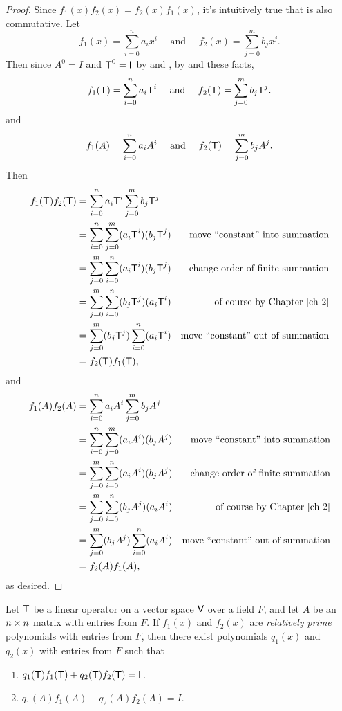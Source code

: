 \begin{proof}
Since \(f_1(x)f_2(x) = f_2(x)f_1(x)\), it's intuitively true that  is also commutative.
Let
\[
    f_1(x) = \sum_{i = 0}^n a_i x^i \quad \text{ and } \quad f_2(x) = \sum_{j = 0}^m b_j x^j.
\]
Then since \(A^0 = I\) and \(\textsf{T}^0 = \textsf{I}_{_{}}\) by  and , by  and these facts,
\[
    f_1(\textsf{T}) = \sum_{i = 0}^n a_i \textsf{T}^i \quad \text{ and } \quad f_2(\textsf{T}) = \sum_{j = 0}^m b_j \textsf{T}^j.
\]
and
\[
    f_1(A) = \sum_{i = 0}^n a_i A^i \quad \text{ and } \quad f_2(\textsf{T}) = \sum_{j = 0}^m b_j A^j.
\]
Then
\begin{align*}
    f_1(\T) f_2(\T) & = \sum_{i = 0}^n a_i \T^i \sum_{j = 0}^m b_j \T^j \\
                    & = \sum_{i = 0}^n \sum_{j = 0}^m (a_i \T^i) (b_j \T^j) & \text{move ``constant'' into summation} \\
                    & = \sum_{j = 0}^m \sum_{i = 0}^n (a_i \T^i) (b_j \T^j) & \text{change order of finite summation} \\
                    & = \sum_{j = 0}^m \sum_{i = 0}^n (b_j \T^j) (a_i \T^i) & \text{of course by \CH{2}} \\
                    & = \sum_{j = 0}^m (b_j \T^j) \sum_{i = 0}^n (a_i \T^i) & \text{move ``constant'' out of summation} \\
                    & = f_2(\T) f_1(\T),
\end{align*}
and
\begin{align*}
    f_1(A) f_2(A) & = \sum_{i = 0}^n a_i A^i \sum_{j = 0}^m b_j A^j \\
                    & = \sum_{i = 0}^n \sum_{j = 0}^m (a_i A^i) (b_j A^j) & \text{move ``constant'' into summation} \\
                    & = \sum_{j = 0}^m \sum_{i = 0}^n (a_i A^i) (b_j A^j) & \text{change order of finite summation} \\
                    & = \sum_{j = 0}^m \sum_{i = 0}^n (b_j A^j) (a_i A^i) & \text{of course by \CH{2}} \\
                    & = \sum_{j = 0}^m (b_j A^j) \sum_{i = 0}^n (a_i A^i) & \text{move ``constant'' out of summation} \\
                    & = f_2(A) f_1(A),
\end{align*}
as desired.
\end{proof}

\begin{appendix theorem} \label{thm e.5}
Let \(\textsf{T}\) be a linear operator on a vector space \(\textsf{V}\) over a field \(F\), and let \(A\) be an \(n \times n\) matrix with entries from \(F\).
If \(f_1(x)\) and \(f_2(x)\) are \emph{relatively prime} polynomials with entries from \(F\), then there exist polynomials \(q_1(x)\) and \(q_2(x)\) with entries from \(F\) such that
\begin{enumerate}
\item \(q_1(\textsf{T})f_1(\textsf{T}) + q_2(\textsf{T})f_2(\textsf{T}) = \textsf{I}_{_{}}\).
\item \(q_1(A)f_1(A) + q_2(A)f_2(A) = I\).
\end{enumerate}
\end{appendix theorem}

